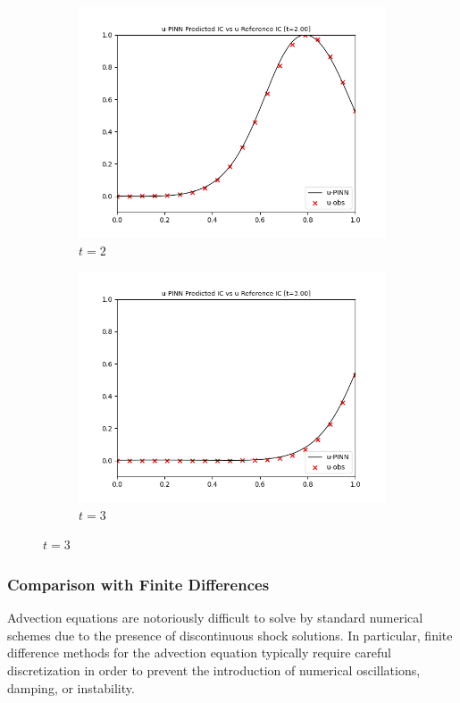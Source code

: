 \documentclass[letterpaper,12pt]{article}
\begin{document}
\begin{figure}[h]
\begin{subfigure}{0.45\textwidth}
            \includegraphics*[width=\textwidth]{advection_forward_t2.00.png}
            \caption{$t = 2$}
        \end{subfigure}
        \hfill
        \begin{subfigure}{0.45\textwidth}
            \includegraphics*[width=\textwidth]{advection_forward_t3.00.png}
            \caption{$t = 3$}
        \end{subfigure}
    \end{figure}

    \subsubsection*{Comparison with Finite Differences}
    Advection equations are notoriously difficult to solve by standard numerical schemes due to the presence of
    discontinuous shock solutions. In particular, finite difference methods for the advection equation typically require
    careful discretization in order to prevent the introduction of numerical oscillations, damping, or instability.
    
\end{document}
